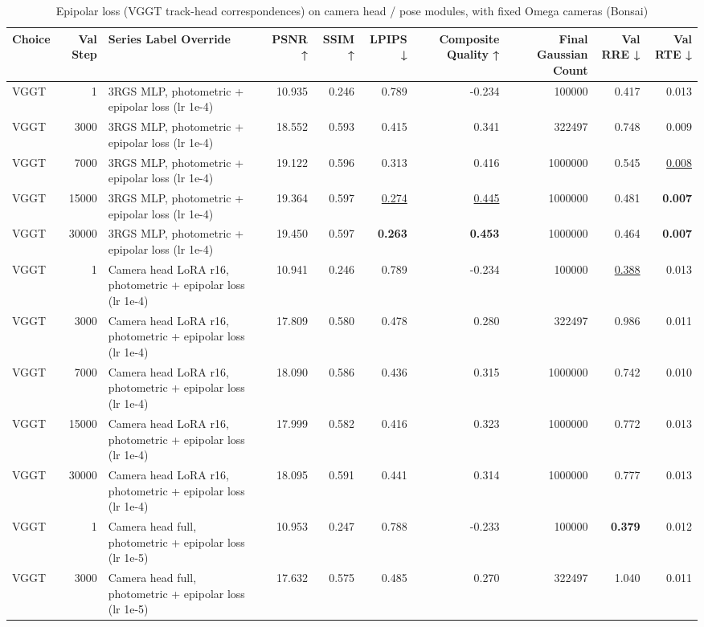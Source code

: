 \begin{table}[H]
\caption{\ifdefined\customcaption \customcaption \else Epipolar loss (VGGT track-head correspondences) on camera head / pose modules, with fixed Omega cameras (Bonsai) \fi}
\label{tab:113_omega_epi_vs_fixed_bonsai}
\centering
\tiny
\begin{tabular}{lrlrrrrrrr}
\toprule
Choice & Val Step & Series Label Override & PSNR ↑ & SSIM ↑ & LPIPS ↓ & Composite Quality ↑ & Final Gaussian Count & Val RRE ↓ & Val RTE ↓ \\
\midrule
VGGT & 1 & 3RGS MLP, photometric + epipolar loss (lr 1e-4) & 10.935 & 0.246 & 0.789 & -0.234 & 100000 & 0.417 & 0.013 \\
VGGT & 3000 & 3RGS MLP, photometric + epipolar loss (lr 1e-4) & 18.552 & 0.593 & 0.415 & 0.341 & 322497 & 0.748 & 0.009 \\
VGGT & 7000 & 3RGS MLP, photometric + epipolar loss (lr 1e-4) & 19.122 & 0.596 & 0.313 & 0.416 & 1000000 & 0.545 & \underline{0.008} \\
VGGT & 15000 & 3RGS MLP, photometric + epipolar loss (lr 1e-4) & 19.364 & 0.597 & \underline{0.274} & \underline{0.445} & 1000000 & 0.481 & \textbf{0.007} \\
VGGT & 30000 & 3RGS MLP, photometric + epipolar loss (lr 1e-4) & 19.450 & 0.597 & \textbf{0.263} & \textbf{0.453} & 1000000 & 0.464 & \textbf{0.007} \\
VGGT & 1 & Camera head LoRA r16, photometric + epipolar loss (lr 1e-4) & 10.941 & 0.246 & 0.789 & -0.234 & 100000 & \underline{0.388} & 0.013 \\
VGGT & 3000 & Camera head LoRA r16, photometric + epipolar loss (lr 1e-4) & 17.809 & 0.580 & 0.478 & 0.280 & 322497 & 0.986 & 0.011 \\
VGGT & 7000 & Camera head LoRA r16, photometric + epipolar loss (lr 1e-4) & 18.090 & 0.586 & 0.436 & 0.315 & 1000000 & 0.742 & 0.010 \\
VGGT & 15000 & Camera head LoRA r16, photometric + epipolar loss (lr 1e-4) & 17.999 & 0.582 & 0.416 & 0.323 & 1000000 & 0.772 & 0.013 \\
VGGT & 30000 & Camera head LoRA r16, photometric + epipolar loss (lr 1e-4) & 18.095 & 0.591 & 0.441 & 0.314 & 1000000 & 0.777 & 0.013 \\
VGGT & 1 & Camera head full, photometric + epipolar loss (lr 1e-5) & 10.953 & 0.247 & 0.788 & -0.233 & 100000 & \textbf{0.379} & 0.012 \\
VGGT & 3000 & Camera head full, photometric + epipolar loss (lr 1e-5) & 17.632 & 0.575 & 0.485 & 0.270 & 322497 & 1.040 & 0.011 \\

\end{tabular}
\end{table}
